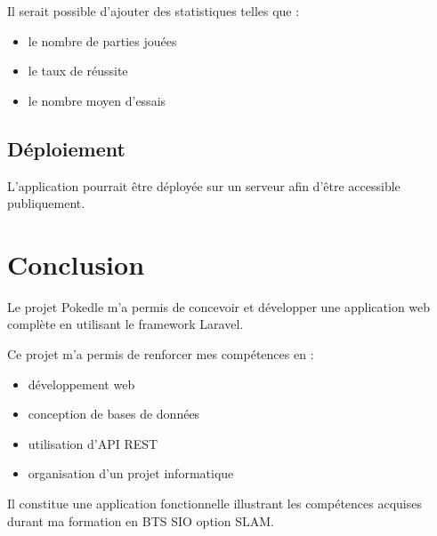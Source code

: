 \documentclass[a4paper,12pt]{article}
\begin{document}
    Il serait possible d'ajouter des statistiques telles que :

    \begin{itemize}
        \item le nombre de parties jouées
        \item le taux de réussite
        \item le nombre moyen d’essais
    \end{itemize}

    \subsection{Déploiement}

    L’application pourrait être déployée sur un serveur afin d’être accessible publiquement.

    \section{Conclusion}

    Le projet Pokedle m’a permis de concevoir et développer une application web complète en utilisant le framework Laravel.

    Ce projet m’a permis de renforcer mes compétences en :

    \begin{itemize}
        \item développement web
        \item conception de bases de données
        \item utilisation d’API REST
        \item organisation d’un projet informatique
    \end{itemize}

    Il constitue une application fonctionnelle illustrant les compétences acquises durant ma formation en BTS SIO option SLAM.
\end{document}
